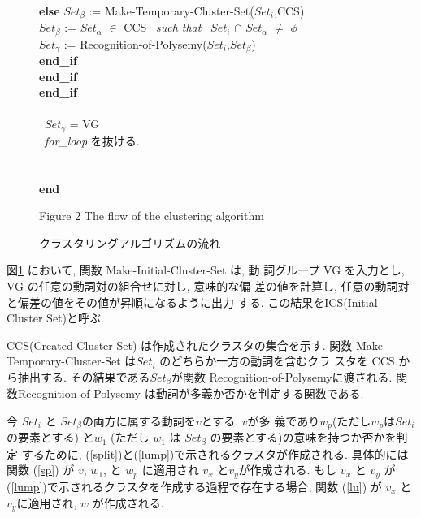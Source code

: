 {\begin{figure}[htbp]
\begin{center}
{{{\hspace*{15mm}{\bf end\_if} \\
{\bf else} $Set_{\beta}$ := {\sf
Make-Temporary-Cluster-Set}($Set_{i}$,CCS) \\
\hspace*{0.8cm}{\bf (}$Set_{\beta}$ := $Set_{\alpha}$ $\in$ \mbox{CCS} \ {\it such that} \
$Set_{i}$ $\cap$ $Set_{\alpha}$ $\neq$ $\phi$ \hspace*{4cm} \\
\hspace*{10mm}$Set_{\gamma}$ := {\sf
Recognition-of-Polysemy}($Set_{i}$,$Set_{\beta}$)  \\
{\bf end\_if} \\ 
{\bf end\_if} \\ 
{\bf end\_if}} \\ \\
\hspace*{10mm}{\bf if} \ $Set_{\gamma}$ = VG  \\
\hspace*{15mm}{\bf then} \ {\it for\_loop} を抜ける. \\
\hspace*{10mm}{\bf end\_if} \\
\hspace*{5mm}{\bf end\_for} \\
{\bf end}}}
\caption{クラスタリングアルゴリズムの流れ} \label{flow_algo}
Figure 2 The flow of the clustering algorithm
\end{center}
\end{figure}
}

\noindent
図\ref{flow_algo} において, 関数 {\sf Make-Initial-Cluster-Set} は, 動
詞グループ VG を入力とし, VG の任意の動詞対の組合せに対し, 意味的な偏
差の値を計算し, 任意の動詞対と偏差の値をその値が昇順になるように出力
する.  この結果をICS(Initial Cluster Set)と呼ぶ.

CCS(Created Cluster Set) は作成されたクラスタの集合を示す.  関数{\sf
Make-Temporary-Cluster-Set} は$Set_{i}$ のどちらか一方の動詞を含むクラ
スタを CCS から抽出する.  その結果である$Set_{\beta}$が関数 {\sf
Recognition-of-Polysemy}に渡される.  関数{\sf Recognition-of-Polysemy}
は動詞が多義か否かを判定する関数である.

今 $Set_{i}$ と $Set_{\beta}$の両方に属する動詞を$v$とする.  $v$が多
義であり$w_{p}$(ただし$w_{p}$は$Set_{i}$の要素とする) と$w_{1}$
(ただし $w_{1}$ は $Set_{\beta}$ の要素とする)の意味を持つか否かを判定
するために, (\ref{split})と(\ref{lump})で示されるクラスタが作成される. 
具体的には関数 (\ref{sp}) が $v$, $w_{1}$, と $w_{p}$ に適用され 
$v_{x}$ と$v_{y}$が作成される.  もし $v_{x}$ と $v_{y}$ が
(\ref{lump})で示されるクラスタを作成する過程で存在する場合, 関数 
(\ref{lu}) が $v_{x}$ と $v_{y}$に適用され, $w$ が作成される.

